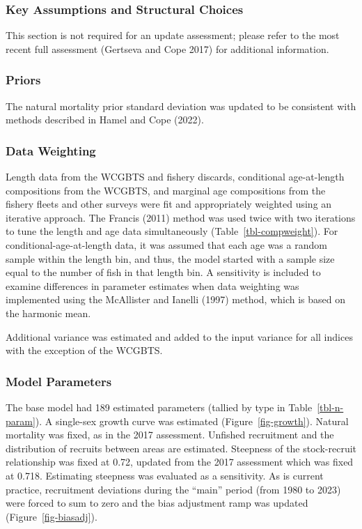 \documentclass[
]{scrartcl}
\begin{document}
\subsubsection{Key Assumptions and Structural
Choices}\label{key-assumptions-and-structural-choices}

This section is not required for an update assessment; please refer to
the most recent full assessment (Gertseva and Cope 2017) for additional
information.

\subsubsection{Priors}\label{priors}

The natural mortality prior standard deviation was updated to be
consistent with methods described in Hamel and Cope (2022).

\subsubsection{Data Weighting}\label{data-weighting}

Length data from the WCGBTS and fishery discards, conditional
age-at-length compositions from the WCGBTS, and marginal age
compositions from the fishery fleets and other surveys were fit and
appropriately weighted using an iterative approach. The Francis (2011)
method was used twice with two iterations to tune the length and age
data simultaneously (Table~\ref{tbl-compweight}). For
conditional-age-at-length data, it was assumed that each age was a
random sample within the length bin, and thus, the model started with a
sample size equal to the number of fish in that length bin. A
sensitivity is included to examine differences in parameter estimates
when data weighting was implemented using the McAllister and Ianelli
(1997) method, which is based on the harmonic mean.

Additional variance was estimated and added to the input variance for
all indices with the exception of the WCGBTS.

\subsubsection{Model Parameters}\label{model-parameters}

The base model had 189 estimated parameters (tallied by type in
Table~\ref{tbl-n-param}). A single-sex growth curve was estimated
(Figure~\ref{fig-growth}). Natural mortality was fixed, as in the 2017
assessment. Unfished recruitment and the distribution of recruits
between areas are estimated. Steepness of the stock-recruit relationship
was fixed at 0.72, updated from the 2017 assessment which was fixed at
0.718. Estimating steepness was evaluated as a sensitivity. As is
current practice, recruitment deviations during the ``main'' period
(from 1980 to 2023) were forced to sum to zero and the bias adjustment
ramp was updated (Figure~\ref{fig-biasadj}).
\end{document}
